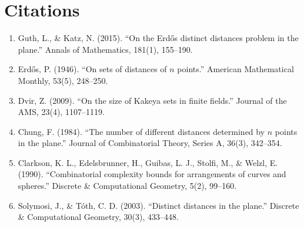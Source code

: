 \section{Citations}

\begin{enumerate}
\item Guth, L., \& Katz, N. (2015). ``On the Erd\H{o}s distinct distances problem in the plane.'' Annals of Mathematics, 181(1), 155--190.
\item Erd\H{o}s, P. (1946). ``On sets of distances of $n$ points.'' American Mathematical Monthly, 53(5), 248--250.
\item Dvir, Z. (2009). ``On the size of Kakeya sets in finite fields.'' Journal of the AMS, 23(4), 1107--1119.
\item Chung, F. (1984). ``The number of different distances determined by $n$ points in the plane.'' Journal of Combinatorial Theory, Series A, 36(3), 342--354.
\item Clarkson, K. L., Edelsbrunner, H., Guibas, L. J., Stolfi, M., \& Welzl, E. (1990). ``Combinatorial complexity bounds for arrangements of curves and spheres.'' Discrete \& Computational Geometry, 5(2), 99--160.
\item Solymosi, J., \& T\'oth, C. D. (2003). ``Distinct distances in the plane.'' Discrete \& Computational Geometry, 30(3), 433--448.
\end{enumerate}
